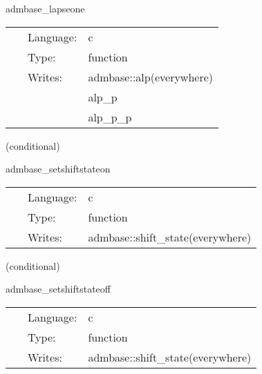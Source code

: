 \documentclass{article}
\begin{document}
\hspace{5mm} admbase\_lapseone 

\hspace{5mm}{\it set the lapse to 1 at all points } 


\hspace{5mm}

 \begin{tabular*}{160mm}{cll} 
~ & Language:  & c \\ 
~ & Type:  & function \\ 
~ & Writes:  & admbase::alp(everywhere) \\ 
~& ~ &alp\_p\\ 
~& ~ &alp\_p\_p\\ 
\end{tabular*} 


\vspace{5mm}

   (conditional) 

\hspace{5mm} admbase\_setshiftstateon 

\hspace{5mm}{\it set the shift\_state variable to 1 } 


\hspace{5mm}

 \begin{tabular*}{160mm}{cll} 
~ & Language:  & c \\ 
~ & Type:  & function \\ 
~ & Writes:  & admbase::shift\_state(everywhere) \\ 
\end{tabular*} 


\vspace{5mm}

   (conditional) 

\hspace{5mm} admbase\_setshiftstateoff 

\hspace{5mm}{\it set the shift\_state variable to 0 } 


\hspace{5mm}

 \begin{tabular*}{160mm}{cll} 
~ & Language:  & c \\ 
~ & Type:  & function \\ 
~ & Writes:  & admbase::shift\_state(everywhere) \\ 
\end{tabular*} 
\end{document}
